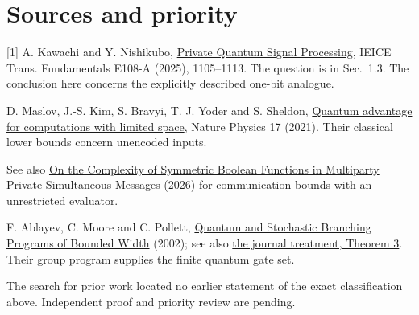 \documentclass[11pt]{article}
\begin{document}
\section*{Sources and priority}
[1] A. Kawachi and Y. Nishikubo, \href{https://doi.org/10.1587/transfun.2024DMP0017}{Private Quantum Signal Processing}, IEICE Trans. Fundamentals E108-A (2025), 1105--1113. The question is in Sec.~1.3. The conclusion here concerns the explicitly described one-bit analogue.\par
[2] D. Maslov, J.-S. Kim, S. Bravyi, T. J. Yoder and S. Sheldon, \href{https://arxiv.org/abs/2008.06478}{Quantum advantage for computations with limited space}, Nature Physics 17 (2021). Their classical lower bounds concern unencoded inputs.\par
[3] See also \href{https://arxiv.org/abs/2610.21216}{On the Complexity of Symmetric Boolean Functions in Multiparty Private Simultaneous Messages} (2026) for communication bounds with an unrestricted evaluator. \par
[4] F. Ablayev, C. Moore and C. Pollett, \href{https://arxiv.org/abs/quant-ph/0201139}{Quantum and Stochastic Branching Programs of Bounded Width} (2002); see also \href{https://www.cs.sjsu.edu/faculty/pollett/papers/ic05.pdf}{the journal treatment, Theorem 3}. Their group program supplies the finite quantum gate set.\par
The search for prior work located no earlier statement of the exact classification above. Independent proof and priority review are pending.
\end{document}
